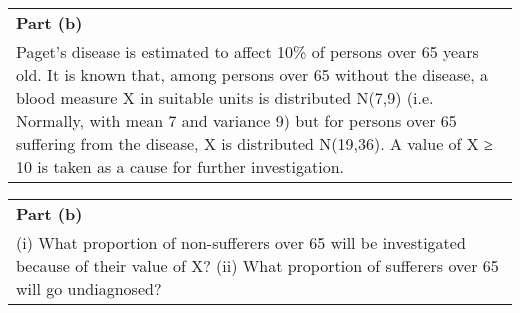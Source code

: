 \documentclass[a4paper,12pt]{article}
\begin{document}
\begin{table}[ht!]
     \centering
     \begin{tabular}{|p{15cm}|}
     \hline        
 \noindent \textbf{Part (b)}\\
\noindent 
Paget's disease is estimated to affect 10\% of persons over 65 years old.  It is known that, among persons over 65 without the disease, a blood measure X in suitable units is distributed N(7,9) (i.e. Normally, with mean 7 and variance 9) but for persons over 65 suffering from the disease, X is distributed N(19,36).  A value of X ≥ 10 is taken as a cause for further investigation.
\\ \hline
 \end{tabular}
\end{table}

\begin{table}[ht!]
     \centering
     \begin{tabular}{|p{15cm}|}
     \hline        
 \noindent \textbf{Part (b)}\\
\noindent
(i) What proportion of non-sufferers over 65 will be investigated because of their value of X?
(ii) What proportion of sufferers over 65 will go undiagnosed?

\\ \hline
 \end{tabular}
\end{table}
\end{document}
